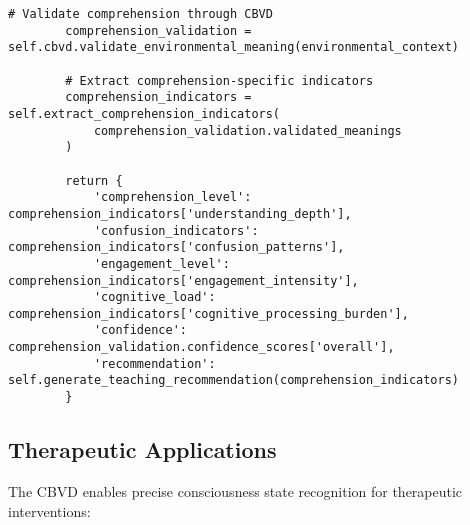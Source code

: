 \documentclass[12pt,a4paper]{article}
\begin{document}
\begin{lstlisting}[style=pythonstyle, caption=Educational CBVD Application]
        # Validate comprehension through CBVD
        comprehension_validation = self.cbvd.validate_environmental_meaning(environmental_context)
        
        # Extract comprehension-specific indicators
        comprehension_indicators = self.extract_comprehension_indicators(
            comprehension_validation.validated_meanings
        )
        
        return {
            'comprehension_level': comprehension_indicators['understanding_depth'],
            'confusion_indicators': comprehension_indicators['confusion_patterns'],
            'engagement_level': comprehension_indicators['engagement_intensity'],
            'cognitive_load': comprehension_indicators['cognitive_processing_burden'],
            'confidence': comprehension_validation.confidence_scores['overall'],
            'recommendation': self.generate_teaching_recommendation(comprehension_indicators)
        }
\end{lstlisting}

\subsection{Therapeutic Applications}

The CBVD enables precise consciousness state recognition for therapeutic interventions:
\end{document}
